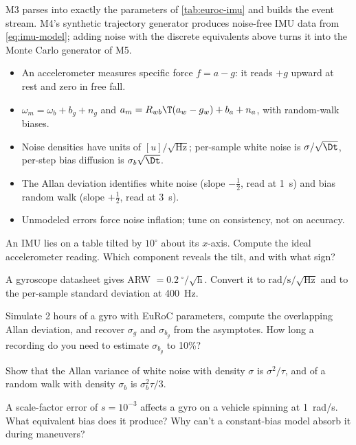 \begin{projectlink}
M3 parses  into exactly the parameters of \cref{tab:euroc-imu} and builds the event stream.
M4's synthetic trajectory generator produces noise-free IMU data from \eqref{eq:imu-model}; adding
noise with the discrete equivalents above turns it into the Monte Carlo generator of M5.
\end{projectlink}

\begin{takeaways}
\begin{itemize}
  \item An accelerometer measures specific force $f = a - g$: it reads $+g$ upward at rest and zero in free fall.
  \item $\omega_m = \omega_b + b_g + n_g$ and $a_m = R_{wb}\T(a_w - g_w) + b_a + n_a$, with random-walk biases.
  \item Noise densities have units of $[u]/\sqrt{\mathrm{Hz}}$; per-sample white noise is $\sigma/\sqrt\Dt$, per-step bias
        diffusion is $\sigma_b\sqrt\Dt$.
  \item The Allan deviation identifies white noise (slope $-\tfrac12$, read at 1~s) and bias random walk (slope
        $+\tfrac12$, read at 3~s).
  \item Unmodeled errors force noise inflation; tune on consistency, not on accuracy.
\end{itemize}
\end{takeaways}

\begin{exercises}
  \item An IMU lies on a table tilted by $10^\circ$ about its $x$-axis. Compute the ideal accelerometer reading.
        Which component reveals the tilt, and with what sign?
  \item A gyroscope datasheet gives ARW $= 0.2\ ^\circ/\sqrt{\mathrm{h}}$. Convert it to
        $\mathrm{rad/s/\sqrt{Hz}}$ and to the per-sample standard deviation at 400~Hz.
  \item Simulate 2 hours of a gyro with EuRoC parameters, compute the overlapping Allan deviation, and recover
        $\sigma_g$ and $\sigma_{b_g}$ from the asymptotes. How long a recording do you need to estimate $\sigma_{b_g}$ to 10\%?
  \item Show that the Allan variance of white noise with density $\sigma$ is $\sigma^2/\tau$, and of a random walk with
        density $\sigma_b$ is $\sigma_b^2\tau/3$.
  \item A scale-factor error of $s = 10^{-3}$ affects a gyro on a vehicle spinning at 1~rad/s. What equivalent bias
        does it produce? Why can't a constant-bias model absorb it during maneuvers?
\end{exercises}
